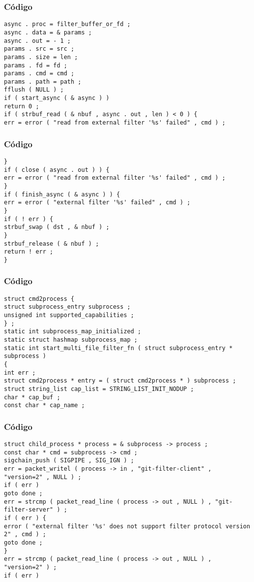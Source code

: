 \documentclass{beamer}
\begin{document}
\begin{frame}[fragile]
\frametitle{C\'odigo}
\begin{verbatim}
async . proc = filter_buffer_or_fd ; 
async . data = & params ; 
async . out = - 1 ; 
params . src = src ; 
params . size = len ; 
params . fd = fd ; 
params . cmd = cmd ; 
params . path = path ; 
fflush ( NULL ) ; 
if ( start_async ( & async ) ) 
return 0 ; 
if ( strbuf_read ( & nbuf , async . out , len ) < 0 ) { 
err = error ( "read from external filter '%s' failed" , cmd ) ; 
\end{verbatim}
\end{frame}
\begin{frame}[fragile]
\frametitle{C\'odigo}
\begin{verbatim}
} 
if ( close ( async . out ) ) { 
err = error ( "read from external filter '%s' failed" , cmd ) ; 
} 
if ( finish_async ( & async ) ) { 
err = error ( "external filter '%s' failed" , cmd ) ; 
} 
if ( ! err ) { 
strbuf_swap ( dst , & nbuf ) ; 
} 
strbuf_release ( & nbuf ) ; 
return ! err ; 
} 
\end{verbatim}
\end{frame}
\begin{frame}[fragile]
\frametitle{C\'odigo}
\begin{verbatim}
struct cmd2process { 
struct subprocess_entry subprocess ; 
unsigned int supported_capabilities ; 
} ; 
static int subprocess_map_initialized ; 
static struct hashmap subprocess_map ; 
static int start_multi_file_filter_fn ( struct subprocess_entry * subprocess ) 
{ 
int err ; 
struct cmd2process * entry = ( struct cmd2process * ) subprocess ; 
struct string_list cap_list = STRING_LIST_INIT_NODUP ; 
char * cap_buf ; 
const char * cap_name ; 
\end{verbatim}
\end{frame}
\begin{frame}[fragile]
\frametitle{C\'odigo}
\begin{verbatim}
struct child_process * process = & subprocess -> process ; 
const char * cmd = subprocess -> cmd ; 
sigchain_push ( SIGPIPE , SIG_IGN ) ; 
err = packet_writel ( process -> in , "git-filter-client" , "version=2" , NULL ) ; 
if ( err ) 
goto done ; 
err = strcmp ( packet_read_line ( process -> out , NULL ) , "git-filter-server" ) ; 
if ( err ) { 
error ( "external filter '%s' does not support filter protocol version 2" , cmd ) ; 
goto done ; 
} 
err = strcmp ( packet_read_line ( process -> out , NULL ) , "version=2" ) ; 
if ( err ) 
\end{verbatim}
\end{frame}
\end{document}

